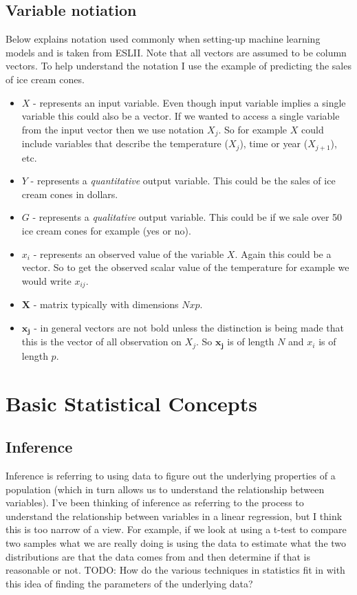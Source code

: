 \documentclass[paper=a4, fontsize=11pt]{scrartcl} %
\numberwithin{equation}{section} %
\numberwithin{figure}{section} %
\numberwithin{table}{section} %
\begin{document}
\subsection{Variable notiation}
\label{sec:notation}

Below explains notation used commonly when setting-up machine learning models and is taken from ESLII. Note that all vectors are assumed to be column vectors. To help understand the notation I use the example of predicting the sales of ice cream cones. 
\vspace{2mm}

\begin{itemize}
\item $X$ - represents an input variable. Even though input variable implies a single variable this could also be a vector. If we wanted to access a single variable from the input vector then we use notation $X_j$. So for example $X$ could include variables that describe the temperature ($X_{j}$), time or year ($X_{j+1}$), etc. 
\item $Y$ - represents a \emph{quantitative} output variable. This could be the sales of ice cream cones in dollars.
\item $G$ - represents a \emph{qualitative} output variable. This could be if we sale over 50 ice cream cones for example (yes or no). 
\item $x_i$ - represents an observed value of the variable $X$. Again this could be a vector. So to get the observed scalar value of the temperature for example we would write $x_{ij}$. 
\item $\bm{X}$ - matrix typically with dimensions $Nxp$. 
\item $\bm{x_j}$ -  in general vectors are not bold unless the distinction is being made that this is the vector of all observation on $X_j$. So $\bm{x_j}$ is of length $N$ and $x_i$ is of length $p$.
\end{itemize}


\section{Basic Statistical Concepts}

\subsection{Inference}

Inference is referring to using data to figure out the underlying properties of a population (which in turn allows us to understand the relationship between variables). I've been thinking of inference as referring to the process to understand the relationship between variables in a linear regression, but I think this is too narrow of a view. For example, if we look at using a t-test to compare two samples what we are really doing is using the data to estimate what the two distributions are that the data comes from and then determine if that is reasonable or not. TODO: How do the various techniques in statistics fit in with this idea of finding the parameters of the underlying data?


\clearpage
\printglossaries
\end{document}
